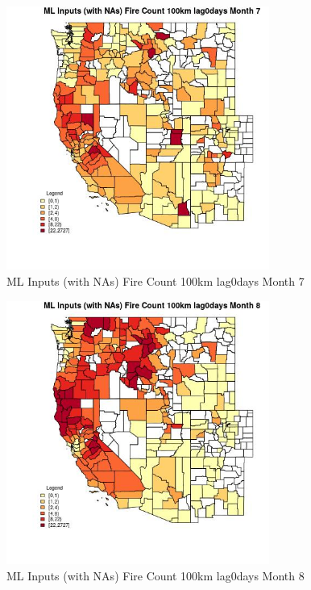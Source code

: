 \clearpage 

\begin{figure} 
\centering  
\includegraphics[width=0.77\textwidth]{Code_Outputs/Report_ML_input_PM25_Step4_part_f_de_duplicated_aves_prioritize_24hr_obswNAs_CountyFire_Count_100km_lag0daysmedianMonth7.jpg} 
\caption{\label{fig:Report_ML_input_PM25_Step4_part_f_de_duplicated_aves_prioritize_24hr_obswNAsCountyFire_Count_100km_lag0daysmedianMonth7}ML Inputs (with NAs) Fire Count 100km lag0days Month 7} 
\end{figure} 
 

\begin{figure} 
\centering  
\includegraphics[width=0.77\textwidth]{Code_Outputs/Report_ML_input_PM25_Step4_part_f_de_duplicated_aves_prioritize_24hr_obswNAs_CountyFire_Count_100km_lag0daysmedianMonth8.jpg} 
\caption{\label{fig:Report_ML_input_PM25_Step4_part_f_de_duplicated_aves_prioritize_24hr_obswNAsCountyFire_Count_100km_lag0daysmedianMonth8}ML Inputs (with NAs) Fire Count 100km lag0days Month 8} 
\end{figure} 
 

